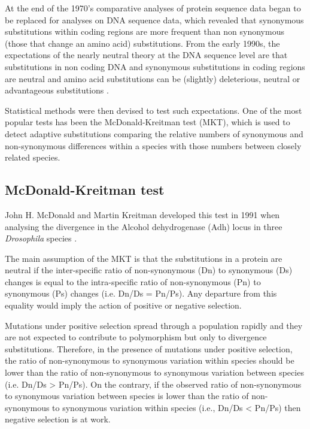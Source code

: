 At the end of the 1970's comparative analyses of protein sequence data began to be replaced for analyses on DNA sequence data, which revealed that synonymous substitutions within coding regions are more frequent than non synonymous (those that change an amino acid) substitutions.
%
From the early 1990s, the expectations of the nearly neutral theory at the DNA sequence level are that substitutions in non coding DNA and synonymous substitutions in coding regions are neutral and amino acid substitutions can be (slightly) deleterious, neutral or advantageous substitutions \citep{Ohta1996}.

Statistical methods were then devised to test such expectations. One of the most popular tests has been the McDonald-Kreitman test (MKT), which is used to detect adaptive substitutions comparing the relative numbers of synonymous and non-synonymous differences within a species with those numbers between closely related species.

\subsection{McDonald-Kreitman test}


John H. McDonald and Martin Kreitman developed this test in 1991 when analysing the divergence in the Alcohol dehydrogenase (Adh) locus in three \textit{Drosophila} species	\citep{McDonald1991}. 

The main assumption of the MKT is that the substitutions in a protein are neutral if the inter-specific ratio of non-synonymous (Dn) to synonymous (Ds) changes is equal to the intra-specific ratio of non-synonymous (Pn) to synonymous (Ps) changes (i.e. Dn/Ds = Pn/Ps). 
Any departure from this equality would imply the action of positive or negative selection.

Mutations under positive selection spread through a population rapidly and they are not expected to contribute to polymorphism but only to divergence substitutions.
Therefore, in the presence of mutations under positive selection, the ratio of non-synonymous to synonymous variation within species should be lower than the ratio of non-synonymous to synonymous variation between species (i.e. Dn/Ds > Pn/Ps). 
On the contrary, if the observed ratio of non-synonymous to synonymous variation between species is lower than the ratio of non-synonymous to synonymous variation within species (i.e., Dn/Ds < Pn/Ps) then negative selection is at work.

